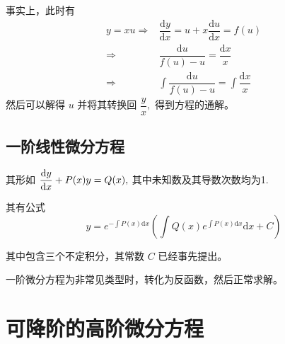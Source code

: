 事实上，此时有 
\begin{equation*}
    \begin{aligned}
        y = xu \Rightarrow& \dfrac{\mathrm{d}y}{\mathrm{d}x} = u + x\dfrac{\mathrm{d}u}{\mathrm{d}x} = f(u) \\ 
        \Rightarrow& \dfrac{\mathrm{d}u}{f(u) - u} = \dfrac{\mathrm{d}x}{x} \\\Rightarrow&
        \int \dfrac{\mathrm{d}u}{f(u) - u} = \int \dfrac{\mathrm{d}x}{x}
    \end{aligned}
\end{equation*}
然后可以解得 $ u $ 并将其转换回 $ \dfrac{y}{x}, $ 得到方程的通解。

\subsection{一阶线性微分方程}

其形如 $ \displaystyle \dfrac{\mathrm{d}y}{\mathrm{d}x} + P(x)y = Q(x), $ 其中未知数及其导数次数均为1.

其有公式$$
    y = e^{-\int P(x)\mathrm{d}x}
    \left(\int Q(x)e^{\int P(x)\mathrm{d}x}\mathrm{d}x+C\right)
$$ 

其中包含三个不定积分，其常数 $ C $ 已经事先提出。

一阶微分方程为非常见类型时，转化为反函数，然后正常求解。

\begin{comment}
\subsection{全微分方程}

一阶微分方程形如 $ \dis P(x,y)\mathrm{d}x + Q(x,y)\mathrm{d}y = 0 $ 满足
$ \dis \dfrac{\partial Q}{\partial x} = \dfrac{\partial P}{\partial y} $ 时，
称为全微分方程。

全微分方程的通解为$$
    \int_{x_0}^xP(x,y_0)\mathrm{d}x + \int_{y_0}^y Q(x,y)\mathrm{d}y = C
$$ 

\subsection{伯努利方程}

形如 $ y' + P(x)y = Q(x)y^n $ 的方程是伯努利方程。
此时令 $ z = y^{1-n} $ 将其变为一阶线性方程。
\end{comment}

\section{可降阶的高阶微分方程}

